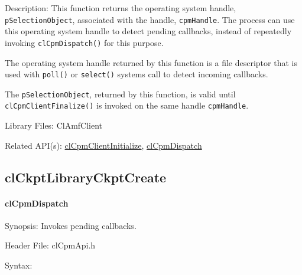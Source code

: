 {\begin{Desc}
\item[Description:]This function returns the operating system handle, {\tt{p\-Selection\-Object}}, associated with the handle, {\tt{cpm\-Handle}}. The 
process can use this operating system handle to detect pending callbacks, instead of repeatedly invoking {\tt{cl\-Cpm\-Dispatch()}} for this purpose. 
\par
 The operating system handle returned by this function is a file descriptor that is used with {\tt{poll()}} or {\tt{select()}} systems call to detect 
 incoming callbacks. \par
 The {\tt{p\-Selection\-Object}}, returned by this function, is valid until {\tt{cl\-Cpm\-Client\-Finalize()}} is invoked on the same handle
 {\tt{cpm\-Handle}}.
 \end{Desc}
\begin{Desc}
\item[Library Files:]Cl\-Amf\-Client\end{Desc}
\begin{Desc}
\item[Related API(s):]\hyperlink{group__group14}{cl\-Cpm\-Client\-Initialize}, \hyperlink{group__group14}{cl\-Cpm\-Dispatch} \end{Desc}

\newpage


\subsection{clCkptLibraryCkptCreate}
\hypertarget{pagecpm111}{}\paragraph{cl\-Cpm\-Dispatch}\label{pagecpm111}
\begin{Desc}
\item[Synopsis:]Invokes pending callbacks.\end{Desc}
\begin{Desc}
\item[Header File:]clCpmApi.h\end{Desc}
\begin{Desc}
\item[Syntax:]


\end{Desc}}
